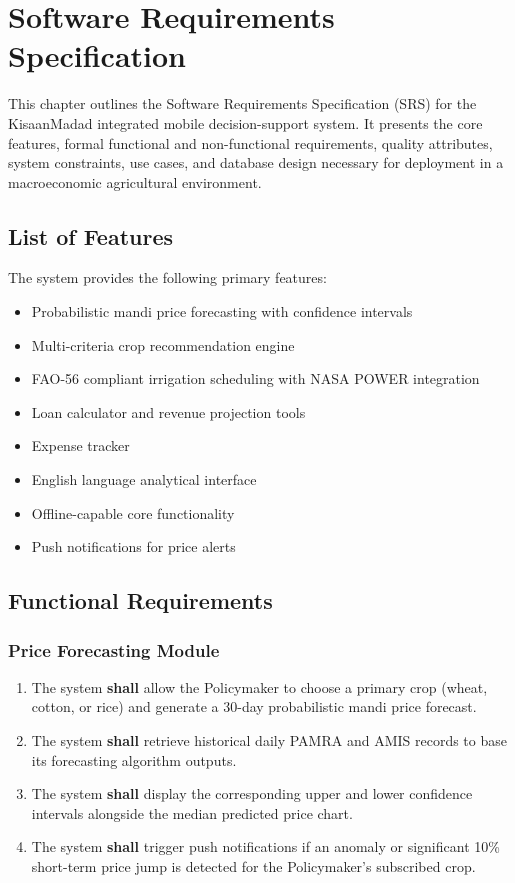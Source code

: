 \chapter{Software Requirements Specification}

This chapter outlines the Software Requirements Specification (SRS) for the KisaanMadad integrated mobile decision-support system. It presents the core features, formal functional and non-functional requirements, quality attributes, system constraints, use cases, and database design necessary for deployment in a macroeconomic agricultural environment.

\section{List of Features}

The system provides the following primary features:
\begin{itemize}
    \item Probabilistic mandi price forecasting with confidence intervals
    \item Multi-criteria crop recommendation engine
    \item FAO-56 compliant irrigation scheduling with NASA POWER integration
    \item Loan calculator and revenue projection tools
    \item Expense tracker
    \item English language analytical interface
    \item Offline-capable core functionality
    \item Push notifications for price alerts
\end{itemize}

\section{Functional Requirements}

\subsection{Price Forecasting Module}
\begin{enumerate}
    \item The system \textbf{shall} allow the Policymaker to choose a primary crop (wheat, cotton, or rice) and generate a 30-day probabilistic mandi price forecast.
    \item The system \textbf{shall} retrieve historical daily PAMRA and AMIS records to base its forecasting algorithm outputs.
    \item The system \textbf{shall} display the corresponding upper and lower confidence intervals alongside the median predicted price chart.
    \item The system \textbf{shall} trigger push notifications if an anomaly or significant 10\% short-term price jump is detected for the Policymaker's subscribed crop.
\end{enumerate}

